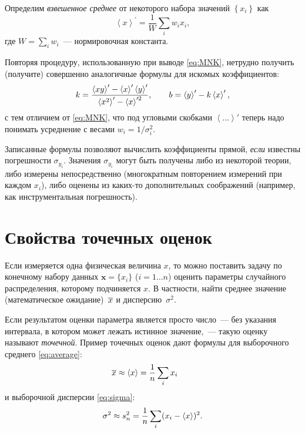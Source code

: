 Определим \emph{взвешенное среднее} от
некоторого набора значений $\left\{x_{i}\right\}$ как
\[
\left\langle x\right\rangle ^{\prime}=\frac{1}{W}\sum_{i}w_{i}x_{i},
\]
где $W=\sum\limits_{i}w_{i}$~--- нормировочная константа.

Повторяя процедуру, использованную при выводе \eqref{eq:MNK}, нетрудно
получить (получите) совершенно аналогичные формулы для искомых коэффициентов:
\begin{equation}
k=\frac{\average{xy}' - \average{x}'\average{y}'}%
    {\average{x^2}' - \average{x}'^2},\qquad
    b=\average{y}' -k \average{x}',\label{eq:MMP}
\end{equation}
с тем отличием от \eqref{eq:MNK}, что под угловыми скобками
$\left\langle \ldots\right\rangle'$
теперь надо понимать усреднение с весами $w_{i}=1/\sigma_{i}^{2}$.

Записанные формулы позволяют вычислить коэффициенты прямой,
\emph{если} известны погрешности $\sigma_{y_{i}}$. Значения $\sigma_{y_{i}}$
могут быть получены либо из некоторой теории, либо измерены непосредственно
(многократным повторением измерений при каждом $x_{i}$), либо оценены из
каких-то дополнительных соображений (например, как инструментальная погрешность).



\section{Свойства точечных оценок} \label{sec:point}
Если измеряется одна физическая величина $x$, то можно поставить задачу
по конечному набору данных $\mathbf{x}=\{x_i\}$ ($i=1\ldots n$) оценить параметры
случайного распределения, которому подчиняется $x$. В частности,
найти среднее значение (математическое ожидание)~$\overline{x}$ и
дисперсию~$\sigma^2$.

Если результатом оценки параметра является просто число~---
без указания интервала, в котором может лежать истинное значение,~---
такую оценку называют \emph{точечной}.
Пример точечных оценок дают формулы для выборочного среднего
\eqref{eq:average}:
\begin{equation}
\overline{x} \approx \left<x\right> = \frac{1}{n}\sum_i x_i\qquad
\label{eq:estimate_x_avg}
\end{equation}
и выборочной дисперсии \eqref{eq:sigma}:
\begin{equation}
\sigma^2 \approx s^2_n = \frac{1}{n}\sum_i (x_i - \left<x\right>)^2.
\label{eq:estimate_x_sigma}
\end{equation}

